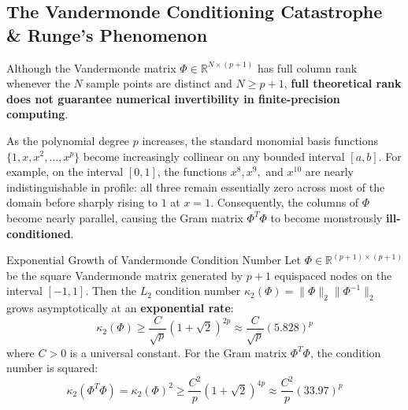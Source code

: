 \subsection{The Vandermonde Conditioning Catastrophe \& Runge's Phenomenon}
\label{subsec:vandermonde_conditioning}

Although the Vandermonde matrix $\Phi \in \mathbb{R}^{N \times (p+1)}$ has full column rank whenever the $N$ sample points are distinct and $N \ge p + 1$, \textbf{full theoretical rank does not guarantee numerical invertibility in finite-precision computing}.

As the polynomial degree $p$ increases, the standard monomial basis functions $\{1, x, x^2, \dots, x^p\}$ become increasingly collinear on any bounded interval $[a, b]$. For example, on the interval $[0, 1]$, the functions $x^8, x^9,$ and $x^{10}$ are nearly indistinguishable in profile: all three remain essentially zero across most of the domain before sharply rising to $1$ at $x = 1$. Consequently, the columns of $\Phi$ become nearly parallel, causing the Gram matrix $\Phi^T \Phi$ to become monstrously \textbf{ill-conditioned}.

\begin{theorembox}{Exponential Growth of Vandermonde Condition Number}
\label{thm:vandermonde_condition_number}
Let $\Phi \in \mathbb{R}^{(p+1) \times (p+1)}$ be the square Vandermonde matrix generated by $p+1$ equispaced nodes on the interval $[-1, 1]$. Then the $L_2$ condition number $\kappa_2(\Phi) = \|\Phi\|_2 \|\Phi^{-1}\|_2$ grows asymptotically at an \textbf{exponential rate}:
\begin{equation}
\kappa_2(\Phi) \ge \frac{C}{\sqrt{p}} (1 + \sqrt{2})^{2p} \approx \frac{C}{\sqrt{p}} (5.828)^p
\label{eq:vander_cond_bound}
\end{equation}
where $C > 0$ is a universal constant. For the Gram matrix $\Phi^T \Phi$, the condition number is squared:
\begin{equation}
\kappa_2(\Phi^T \Phi) = \kappa_2(\Phi)^2 \ge \frac{C^2}{p} (1 + \sqrt{2})^{4p} \approx \frac{C^2}{p} (33.97)^p
\end{equation}
\end{theorembox}

